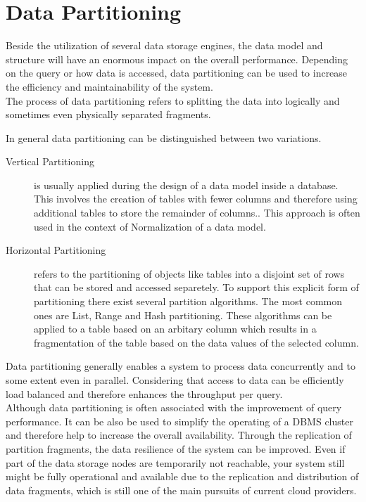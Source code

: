 
\section{Data Partitioning}
\label{sec:part}

Beside the utilization of several data storage engines, the data model and structure 
will have an enormous impact on the overall performance. Depending on the query or 
how data is accessed, data partitioning can be used to increase the efficiency and 
maintainability of the system\cite{Agrawal_2004}.\\
The process of data partitioning refers to splitting the data into logically and sometimes even
physically separated fragments.

In general data partitioning can be distinguished between two variations.

\begin{description}
    \item [Vertical Partitioning] is usually applied during the design of a data model inside a 
    database. This involves the creation of tables with fewer columns and therefore using additional 
    tables to store the remainder of columns.\cite{vertical_1984}. This approach is often used in the 
    context of Normalization of a data model\cite{normalization_2012}. 
    \item [Horizontal Partitioning] refers to the partitioning of objects like tables 
    into a disjoint set of rows that can be stored and accessed separetely\cite{horizontal_1982}.
    To support this explicit form of partitioning there exist several partition algorithms.
    The most common ones are List, Range and Hash partitioning. These algorithms can be applied to a
    table based on an arbitary column which results in a fragmentation of the table 
    based on the data values of the selected column.
\end{description}

Data partitioning generally enables a system to process data concurrently and 
to some extent even in parallel. Considering that access to data can be 
efficiently load balanced and therefore enhances the throughput per query.\\

Although data partitioning is often associated with the improvement of query performance.
It can be also be used to simplify the operating of a DBMS cluster and therefore help 
to increase the overall availability.
Through the replication of partition fragments, the data resilience of the system
can be improved. Even if part of the data storage nodes are temporarily not 
reachable, your system still might be fully operational and available due to the 
replication and distribution of data fragments, which is still one of the main 
pursuits of current cloud providers\cite{dbre2017}.

